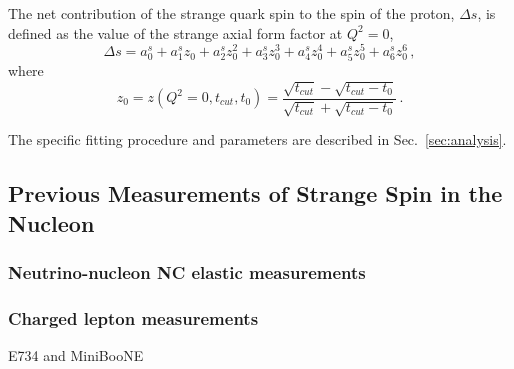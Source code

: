   The net contribution of the strange quark spin to the spin of the proton,
  $\Delta s$, is defined as the value of the strange axial form factor at $Q^2
  = 0$,
  \begin{equation}
    \Delta s = a_0^s + a_1^s z_0 + a_2^s z_0^2 
      + a_3^s z_0^3 + a_4^s z_0^4 + a_5^s z_0^5 + a_6^s z_0^6 \,,
  \end{equation}
  where
  \begin{equation*}
    z_0 = z(Q^2 = 0,t_{cut},t_0) = \frac{\sqrt{t_{cut}} - \sqrt{t_{cut} - t_0}}{\sqrt{t_{cut}} + \sqrt{t_{cut} - t_0}} \,.
  \end{equation*}

  The specific fitting procedure and parameters are described in
  Sec.~\ref{sec:analysis}.


\subsection{Previous Measurements of Strange Spin in the Nucleon}\label{sec:measurements}
  \subsubsection{Neutrino-nucleon NC elastic measurements}

  \subsubsection{Charged lepton measurements}
    E734 and MiniBooNE

